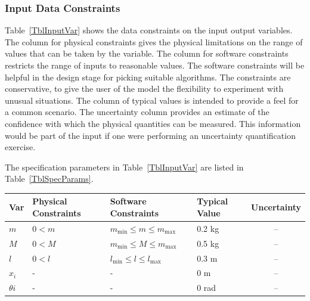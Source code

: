 \documentclass[12pt]{article}
\begin{document}

\subsubsection{Input Data Constraints} \label{sec_DataConstraints}    

Table~\ref{TblInputVar} shows the data constraints on the input output
variables.  The column for physical constraints gives the physical limitations
on the range of values that can be taken by the variable.  The column for
software constraints restricts the range of inputs to reasonable values.  The
software constraints will be helpful in the design stage for picking suitable
algorithms.  The constraints are conservative, to give the user of the model the
flexibility to experiment with unusual situations.  The column of typical values
is intended to provide a feel for a common scenario.  The uncertainty column
provides an estimate of the confidence with which the physical quantities can be
measured.  This information would be part of the input if one were performing an
uncertainty quantification exercise.

The specification parameters in Table~\ref{TblInputVar} are listed in
Table~\ref{TblSpecParams}.

\begin{table}[!h]
  \caption{Input Variables} \label{TblInputVar}
  \renewcommand{\arraystretch}{1}
\noindent \begin{longtable*}{l l l l c} 
  \toprule
  \textbf{Var} & \textbf{Physical Constraints} & \textbf{Software Constraints} &
                             \textbf{Typical Value} & \textbf{Uncertainty}\\
  \midrule 
  $m$ & $ 0< m$ & $m_{\text{min}} \leq m \leq m_{\text{max}}$ & 0.2 \si[per-mode=symbol] {\kilogram} & -- \\
  $M$ & $ 0<M $ & $m_{\text{min}} \leq M \leq m_{\text{max}}$ & 0.5 \si[per-mode=symbol] {\kilogram} & -- \\
  $l$ & $0<l $ & $l_{\text{min}} \leq l \leq l_{\text{max}}$ & 0.3 \si[per-mode=symbol] {\metre} &  --\\
  $x_i$ & - & - & 0 \si{\metre} & -- \\
  $\theta{i}$ & -  & - & 0 \si{\radian} & -- \\
  \bottomrule
\end{longtable*}
\end{table}
\end{document}

